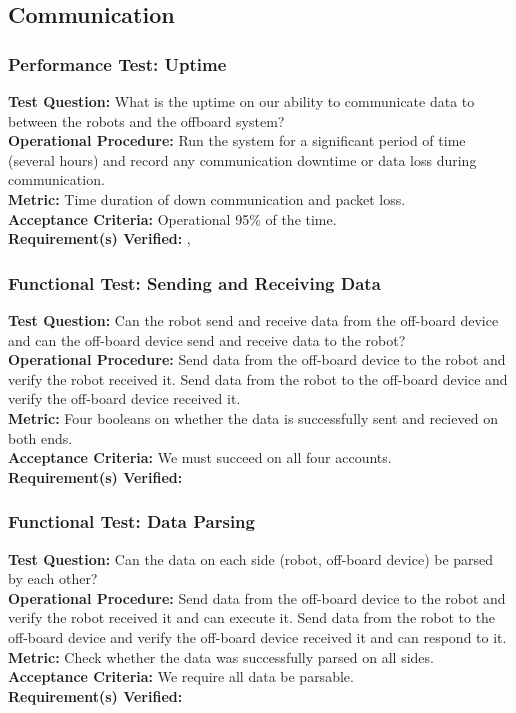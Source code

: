 
\subsection{Communication}
\label{sec:verification_comm}


\subsubsection{Performance Test: Uptime}
\label{sec:comm_pt_reliability}
\textbf{Test Question:} What is the uptime on our ability to communicate data to between the robots and the offboard system?  \\
\textbf{Operational Procedure:} Run the system for a significant period of time (several hours) and record any communication downtime or data loss during communication. \\
\textbf{Metric:} Time duration of down communication and packet loss. \\
\textbf{Acceptance Criteria:} Operational 95\% of the time.\\
\textbf{Requirement(s) Verified:} , 

\subsubsection{Functional Test: Sending and Receiving Data}
\label{sec:comm_ft_send}
\textbf{Test Question:} Can the robot send and receive data from the off-board device and can the off-board device send and receive data to the robot?\\
\textbf{Operational Procedure:} Send data from the off-board device to the robot and verify the robot received it. Send data from the robot to the off-board device and verify the off-board device received it. \\
\textbf{Metric:} Four booleans on whether the data is successfully sent and recieved on both ends. \\
\textbf{Acceptance Criteria:} We must succeed on all four accounts. \\
\textbf{Requirement(s) Verified:} 

\subsubsection{Functional Test: Data Parsing}
\label{sec:comm_ft_parse}
\textbf{Test Question:}  Can the data on each side (robot, off-board device) be parsed by each other? \\
\textbf{Operational Procedure:} Send data from the off-board device to the robot and verify the robot received it and can execute it. Send data from the robot to the off-board device and verify the off-board device received it and can respond to it. \\
\textbf{Metric:} Check whether the data was successfully parsed on all sides. \\
\textbf{Acceptance Criteria:} We require all data be parsable. \\
\textbf{Requirement(s) Verified:} 

